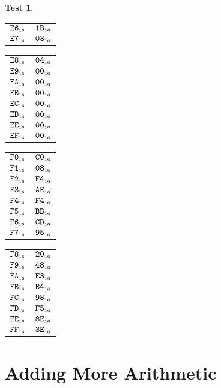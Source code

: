 \documentclass[a4paper,12pt]{article}
\makeatletter
\newcommand{\num}[1]{\texttt{#1}}
\newcommand{\hex}[1]{\num{#1}_{\textup{\tiny 16}}}
\newcommand{\MEM}[1]{\ifthenelse{\equal{#1}{}}{M}{M[#1]}}
\theoremstyle{definition}
\newtheorem{test}{Test}
\newenvironment{memtable}{%
  \begin{trivlist}
    \item
    }{%
    \end{trivlist}}
\newenvironment{memcolumn}{%
  \begin{tabular}{@{}ll@{}}
    \hline}
    {%
    \hline
  \end{tabular}}
\newcommand{\memspace}{\qquad}
\makeatother
\begin{document}
\begin{test}
\begin{memtable}
\begin{memcolumn}
      $\hex{E6}$ & $\hex{1B}$ \\
      $\hex{E7}$ & $\hex{03}$ \\
    \end{memcolumn}
    \memspace
    \begin{memcolumn}
      $\hex{E8}$ & $\hex{04}$ \\
      $\hex{E9}$ & $\hex{00}$ \\
      $\hex{EA}$ & $\hex{00}$ \\
      $\hex{EB}$ & $\hex{00}$ \\
      $\hex{EC}$ & $\hex{00}$ \\
      $\hex{ED}$ & $\hex{00}$ \\
      $\hex{EE}$ & $\hex{00}$ \\
      $\hex{EF}$ & $\hex{00}$ \\
    \end{memcolumn}
    \memspace
    \begin{memcolumn}
      $\hex{F0}$ & $\hex{C0}$ \\
      $\hex{F1}$ & $\hex{08}$ \\
      $\hex{F2}$ & $\hex{F4}$ \\
      $\hex{F3}$ & $\hex{AE}$ \\
      $\hex{F4}$ & $\hex{F4}$ \\
      $\hex{F5}$ & $\hex{BB}$ \\
      $\hex{F6}$ & $\hex{CD}$ \\
      $\hex{F7}$ & $\hex{95}$ \\
    \end{memcolumn}
    \memspace
    \begin{memcolumn}
      $\hex{F8}$ & $\hex{20}$ \\
      $\hex{F9}$ & $\hex{48}$ \\
      $\hex{FA}$ & $\hex{E3}$ \\
      $\hex{FB}$ & $\hex{B4}$ \\
      $\hex{FC}$ & $\hex{98}$ \\
      $\hex{FD}$ & $\hex{F5}$ \\
      $\hex{FE}$ & $\hex{8E}$ \\
      $\hex{FF}$ & $\hex{3E}$ \\
    \end{memcolumn}
  \end{memtable}
\end{test}

\section{Adding More Arithmetic}
\end{document}
